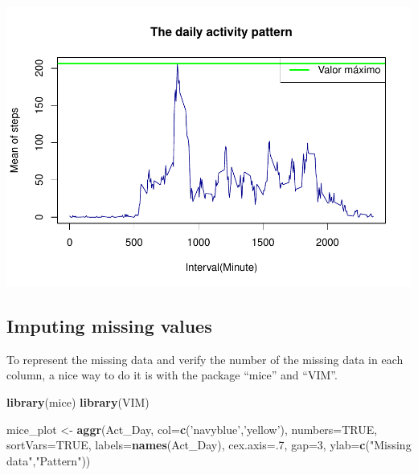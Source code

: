 \documentclass[]{article}
\newenvironment{Shaded}{\begin{snugshade}}{\end{snugshade}}
\newcommand{\DataTypeTok}[1]{\textcolor[rgb]{0.13,0.29,0.53}{#1}}
\newcommand{\DecValTok}[1]{\textcolor[rgb]{0.00,0.00,0.81}{#1}}
\newcommand{\KeywordTok}[1]{\textcolor[rgb]{0.13,0.29,0.53}{\textbf{#1}}}
\newcommand{\NormalTok}[1]{#1}
\newcommand{\OtherTok}[1]{\textcolor[rgb]{0.56,0.35,0.01}{#1}}
\newcommand{\StringTok}[1]{\textcolor[rgb]{0.31,0.60,0.02}{#1}}
\begin{document}
\includegraphics{PA1_template_files/figure-latex/ploting 2-1.pdf}

\hypertarget{imputing-missing-values}{%
\subsection{Imputing missing values}\label{imputing-missing-values}}

To represent the missing data and verify the number of the missing data
in each column, a nice way to do it is with the package ``mice'' and
``VIM''.

\begin{Shaded}
\begin{Highlighting}[]
\KeywordTok{library}\NormalTok{(mice)}
\KeywordTok{library}\NormalTok{(VIM)}

\NormalTok{mice_plot <-}\StringTok{ }\KeywordTok{aggr}\NormalTok{(Act_Day, }
                  \DataTypeTok{col=}\KeywordTok{c}\NormalTok{(}\StringTok{'navyblue'}\NormalTok{,}\StringTok{'yellow'}\NormalTok{),}
                  \DataTypeTok{numbers=}\OtherTok{TRUE}\NormalTok{, }
                  \DataTypeTok{sortVars=}\OtherTok{TRUE}\NormalTok{,}
                  \DataTypeTok{labels=}\KeywordTok{names}\NormalTok{(Act_Day), }
                  \DataTypeTok{cex.axis=}\NormalTok{.}\DecValTok{7}\NormalTok{,}
                  \DataTypeTok{gap=}\DecValTok{3}\NormalTok{, }
                  \DataTypeTok{ylab=}\KeywordTok{c}\NormalTok{(}\StringTok{"Missing data"}\NormalTok{,}\StringTok{"Pattern"}\NormalTok{))}
\end{Highlighting}
\end{Shaded}
\end{document}
